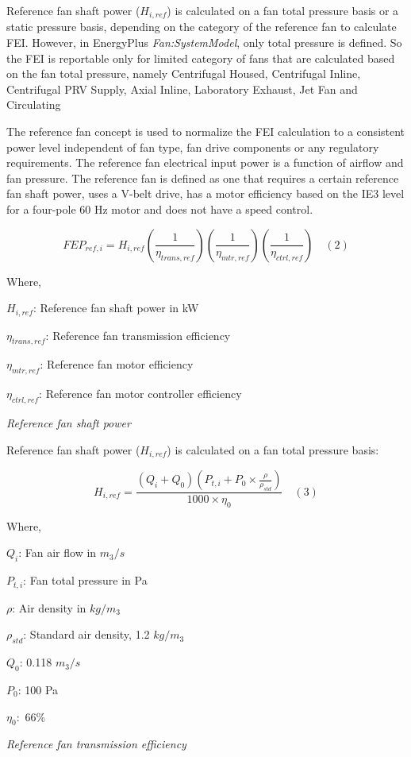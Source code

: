 Reference fan shaft power (\(H_{i,ref}\)) is calculated on a fan total pressure basis or a static pressure basis, depending on the category of the reference fan to calculate FEI. However, in EnergyPlus \emph{Fan:SystemModel}, only total pressure is defined. So the FEI is reportable only for limited category of fans that are calculated based on the fan total pressure, namely Centrifugal Housed, Centrifugal Inline, Centrifugal PRV Supply, Axial Inline, Laboratory Exhaust, Jet Fan and Circulating 

The reference fan concept is used to normalize the FEI calculation to a consistent power level independent of fan type, fan drive components or any regulatory requirements. The reference fan electrical input power is a function of airflow and fan pressure. The reference fan is defined as one that requires a certain reference fan shaft power, uses a V-belt drive, has a motor efficiency based on the IE3 level for a four-pole 60 Hz motor and does not have a speed control.

$$FEP_{ref,i}=H_{i,ref}(\frac{1}{\eta_{trans,ref}} )(\frac{1}{\eta_{mtr,ref}})(\frac{1}{\eta_{ctrl,ref}}) \quad (2) $$ 

Where,

\(H_{i,ref}\): Reference fan shaft power in kW

\(\eta_{trans,ref}\): Reference fan transmission efficiency

\(\eta_{mtr,ref}\): Reference fan motor efficiency

\(\eta_{ctrl,ref}\): Reference fan motor controller efficiency

\emph{Reference fan shaft power}

Reference fan shaft power (\(H_{i,ref}\)) is calculated on a fan total pressure basis:

$$H_{i,ref}=\frac{(Q_i + Q_0)(P_{t,i} + P_0 \times \frac{\rho}{\rho_{std}} )}{1000 \times \eta_0} \quad (3) $$ 


Where,

\(Q_i\): Fan air flow in \(m_3/s\)

\(P_{t,i}\): Fan total pressure in Pa

\(\rho\): Air density in \(kg/m_3\)

\(\rho_{std}\): Standard air density, 1.2 \(kg/m_3\)

\(Q_0\): 0.118 \(m_3/s\)

\(P_0\): 100 Pa

\(\eta_0:\) 66\% 

\emph{Reference fan transmission efficiency}

